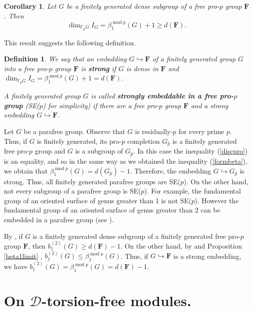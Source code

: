 \documentclass[11pt]{amsart}
\newtheorem{cor}[lem]{Corollary}
\newtheorem{definition}[lem]{Definition}
\numberwithin{claimcounter}{lem}
\newcommand{\F}{\mathbb{F}}
\begin{document}
\begin{cor} Let $G$ be a finitely generated dense subgroup of a free pro-$p$ group $\mathbf F$. Then
\begin{equation}
\label{formbeta}
\dim_{\F_pG}I_G=\beta_1^{\operatorname{mod}p}(G)+1\ge d(\mathbf F).\end{equation}
\end{cor}
This result suggests the following definition.
\begin{definition} \label{defsep}
We say that
an embedding $G\hookrightarrow \mathbf F$ of a finitely generated group $G$ into a free pro-$p$ group $\mathbf F$ is {\bf strong} if   $G$ is dense  in $\mathbf F$ and $\dim_{\F_pG}I_G=\beta_1^{\operatorname{mod}p}(G)+1 = d(\mathbf F)$.   

 A finitely generated group $G$ is called {\bf strongly embeddable in a free pro-$p$ group} (SE($p$) for simplicity) if there are  a free pro-$p$ group $\mathbf F$ and a strong embedding  $ G\hookrightarrow \mathbf F$. 
 \end{definition}
 
Let $G$ be  a parafree group. Observe that $G$ is residually-$p$ for every prime $p$. Thus, if $G$ is finitely generated, its  pro-$p$ completion  $G_{\widehat p}$ is a finitely generated free pro-$p$ group    and $G$ is a subgroup of $G_{\widehat p}$.  In this case the inequality (\ref{discpro}) is an equality, and so in the same way as we obtained the inequality (\ref{formbeta}), we obtain  that $\beta_1^{\operatorname{mod}p}(G)= d( G_{\widehat p})-1$. Therefore,   the embedding $G\hookrightarrow G_{\widehat p}$  is strong. Thus, all finitely generated parafree groups are SE($p$). On the other hand, not every subgroup of a parafree group is SE($p$). For example,   the fundamental group  of an oriented surface  of genus greater than 1   is not SE($p$).  However    the fundamental group  of an oriented surface  of genus greater than 2 can be embedded in a parafree group (see \cite[Section 4.1]{Ba69}). 

 
By  \cite[Proposition 7.5]{BR15}, if $G$ is a finitely generated dense subgroup of a finitely generated free pro-$p$ group $\mathbf F$, then $b_1^{(2)}(G)\ge d(\mathbf F)-1$. On the other hand, by \cite[Theorem 1.6]{EL14} and Proposition \ref{beta1limit} , $b_1^{(2)}(G)\le \beta_1^{\operatorname{mod}p}(G)$. Thus, if $G\hookrightarrow \mathbf F$ is a strong embedding, we have $b_1^{(2)}(G)=\beta_1^{\operatorname{mod}p}(G)=d(\mathbf F)-1$.

\section{On $\mathcal D$-torsion-free modules.}\label{tech}
\end{document}
